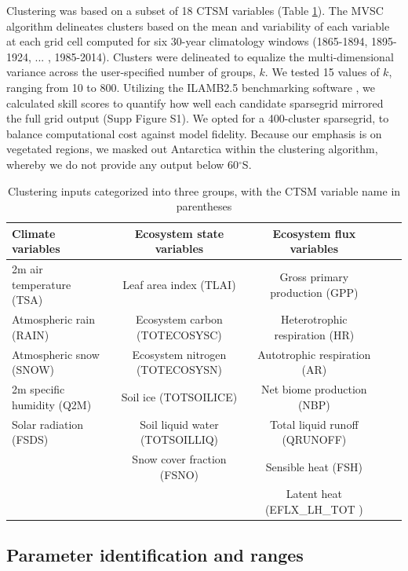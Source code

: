\documentclass[draft]{agujournal2019}
\begin{document}
Clustering was based on a subset of 18 CTSM variables (Table \ref{tab:sg}). The MVSC algorithm delineates clusters based on the mean and variability of each variable at each grid cell computed for six 30-year climatology windows (1865-1894, 1895-1924, ... , 1985-2014). Clusters were delineated to equalize the multi-dimensional variance across the user-specified number of groups, $k$. We tested 15 values of $k$, ranging from 10 to 800. Utilizing the ILAMB2.5 benchmarking software \cite{collier2018}, we calculated skill scores to quantify how well each candidate sparsegrid mirrored the full grid output (Supp Figure S1). We opted for a 400-cluster sparsegrid, to balance computational cost against model fidelity. Because our emphasis is on vegetated regions, we masked out Antarctica within the clustering algorithm, whereby we do not provide any output below 60$^\circ$S.

\begin{table}[h]
\caption{Clustering inputs categorized into three groups, with the CTSM variable name in parentheses}
\centering
\begin{tabular}{l c c c c}
 \hline
 Climate variables & Ecosystem state variables &Ecosystem flux variables \\
 \hline
 2m air temperature (TSA) & Leaf area index (TLAI) & Gross primary production (GPP) \\
Atmospheric rain (RAIN) & Ecosystem carbon (TOTECOSYSC) &Heterotrophic respiration (HR) \\
Atmospheric snow (SNOW) &  Ecosystem nitrogen (TOTECOSYSN) &Autotrophic respiration (AR) \\
2m specific humidity (Q2M) & Soil ice (TOTSOILICE) &Net biome production (NBP) \\
Solar radiation (FSDS) & Soil liquid water (TOTSOILLIQ) & Total liquid runoff (QRUNOFF) \\
& Snow cover fraction (FSNO) & Sensible heat  (FSH) \\
&&Latent heat (EFLX\_LH\_TOT ) \\
 \hline
 \end{tabular}
 \label{tab:sg}
 \end{table}

\subsection{Parameter identification and ranges}
\end{document}
